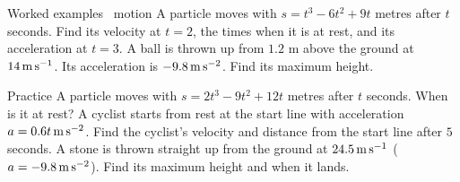 \documentclass[aspectratio=169,11pt,t,xcolor=table]{beamer}
\begin{document}
\begin{frame}{Worked examples \textperiodcentered\ motion}\relax
{} A particle moves with $s=t^{3}-6t^{2}+9t$ metres after $t$ seconds. Find its velocity at $t=2$, the times when it is at rest, and its acceleration at $t=3$.
\vskip5mm
 A ball is thrown up from $1.2$ m above the ground at $14\,\mathrm{m\,s^{-1}}$. Its acceleration is $-9.8\,\mathrm{m\,s^{-2}}$. Find its maximum height.
\end{frame}

\begin{frame}{Practice}\relax
{} A particle moves with $s=2t^{3}-9t^{2}+12t$ metres after $t$ seconds. When is it at rest?
\vskip4mm
 A cyclist starts from rest at the start line with acceleration $a=0.6t\,\mathrm{m\,s^{-2}}$. Find the cyclist's velocity and distance from the start line after $5$ seconds.
\vskip4mm
 A stone is thrown straight up from the ground at $24.5\,\mathrm{m\,s^{-1}}$ ($a=-9.8\,\mathrm{m\,s^{-2}}$). Find its maximum height and when it lands.
\end{frame}
\end{document}
